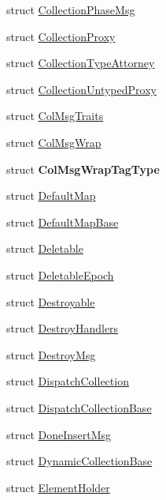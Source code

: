 \begin{DoxyCompactItemize}
\item 
struct \hyperlink{structvt_1_1vrt_1_1collection_1_1_collection_phase_msg}{Collection\+Phase\+Msg}
\item 
struct \hyperlink{structvt_1_1vrt_1_1collection_1_1_collection_proxy}{Collection\+Proxy}
\item 
struct \hyperlink{structvt_1_1vrt_1_1collection_1_1_collection_type_attorney}{Collection\+Type\+Attorney}
\item 
struct \hyperlink{structvt_1_1vrt_1_1collection_1_1_collection_untyped_proxy}{Collection\+Untyped\+Proxy}
\item 
struct \hyperlink{structvt_1_1vrt_1_1collection_1_1_col_msg_traits}{Col\+Msg\+Traits}
\item 
struct \hyperlink{structvt_1_1vrt_1_1collection_1_1_col_msg_wrap}{Col\+Msg\+Wrap}
\item 
struct {\bfseries Col\+Msg\+Wrap\+Tag\+Type}
\item 
struct \hyperlink{structvt_1_1vrt_1_1collection_1_1_default_map}{Default\+Map}
\item 
struct \hyperlink{structvt_1_1vrt_1_1collection_1_1_default_map_base}{Default\+Map\+Base}
\item 
struct \hyperlink{structvt_1_1vrt_1_1collection_1_1_deletable}{Deletable}
\item 
struct \hyperlink{structvt_1_1vrt_1_1collection_1_1_deletable_epoch}{Deletable\+Epoch}
\item 
struct \hyperlink{structvt_1_1vrt_1_1collection_1_1_destroyable}{Destroyable}
\item 
struct \hyperlink{structvt_1_1vrt_1_1collection_1_1_destroy_handlers}{Destroy\+Handlers}
\item 
struct \hyperlink{structvt_1_1vrt_1_1collection_1_1_destroy_msg}{Destroy\+Msg}
\item 
struct \hyperlink{structvt_1_1vrt_1_1collection_1_1_dispatch_collection}{Dispatch\+Collection}
\item 
struct \hyperlink{structvt_1_1vrt_1_1collection_1_1_dispatch_collection_base}{Dispatch\+Collection\+Base}
\item 
struct \hyperlink{structvt_1_1vrt_1_1collection_1_1_done_insert_msg}{Done\+Insert\+Msg}
\item 
struct \hyperlink{structvt_1_1vrt_1_1collection_1_1_dynamic_collection_base}{Dynamic\+Collection\+Base}
\item 
struct \hyperlink{structvt_1_1vrt_1_1collection_1_1_element_holder}{Element\+Holder}
\item 

\end{DoxyCompactItemize}
